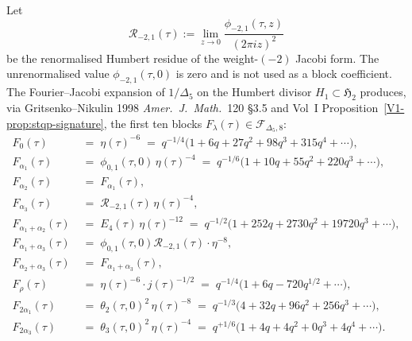 \begin{theorem}
\label{thm:modbootstrap-cross-explicit-blocks}
\ClaimStatusConditional
{}
Let
\[
 \mathcal R_{-2,1}(\tau)
 :=
 \lim_{z\to0}\frac{\phi_{-2,1}(\tau,z)}{(2\pi iz)^2}
\]
be the renormalised Humbert residue of the weight-$(-2)$ Jacobi form.
The unrenormalised value $\phi_{-2,1}(\tau,0)$ is zero and is not used
as a block coefficient.
The Fourier--Jacobi expansion of $1/\Delta_5$ on the
Humbert divisor $H_1\subset\mathfrak H_2$ produces, via
Gritsenko--Nikulin 1998 \emph{Amer.~J.~Math.}~120 \S 3.5 and
Vol~I Proposition~\ref{V1-prop:stqp-signature}, the first ten
blocks $F_\lambda(\tau)\in\mathcal F_{\Delta_5, 8}$:
\begin{align}
 F_0(\tau)
 &\;=\;\eta(\tau)^{-6}
 \;=\;q^{-1/4}\bigl(1 + 6q + 27q^2 + 98q^3 + 315q^4 + \cdots\bigr),
 \label{eq:modbootstrap-explicit-F0}\\
 F_{\alpha_1}(\tau)
 &\;=\;\phi_{0,1}(\tau,0)\,\eta(\tau)^{-4}
 \;=\;q^{-1/6}\bigl(1 + 10q + 55q^2 + 220q^3 + \cdots\bigr),
 \label{eq:modbootstrap-explicit-Fa1}\\
 F_{\alpha_2}(\tau)
 &\;=\;F_{\alpha_1}(\tau),
 \label{eq:modbootstrap-explicit-Fa2}\\
 F_{\alpha_3}(\tau)
 &\;=\;\mathcal R_{-2,1}(\tau)\,\eta(\tau)^{-4},
 \label{eq:modbootstrap-explicit-Fa3}\\
 F_{\alpha_1 + \alpha_2}(\tau)
 &\;=\;E_4(\tau)\,\eta(\tau)^{-12}
 \;=\;q^{-1/2}\bigl(1 + 252q + 2730q^2 + 19720q^3 + \cdots\bigr),
 \label{eq:modbootstrap-explicit-Fa1a2}\\
 F_{\alpha_1 + \alpha_3}(\tau)
 &\;=\;\phi_{0,1}(\tau,0)\mathcal R_{-2,1}(\tau)\cdot\eta^{-8},
 \label{eq:modbootstrap-explicit-Fa1a3}\\
 F_{\alpha_2 + \alpha_3}(\tau)
 &\;=\;F_{\alpha_1 + \alpha_3}(\tau),
 \label{eq:modbootstrap-explicit-Fa2a3}\\
 F_{\rho}(\tau)
 &\;=\;\eta(\tau)^{-6}\cdot j(\tau)^{-1/2}
 \;=\;q^{-1/4}\bigl(1 + 6q - 720 q^{1/2} + \cdots\bigr),
 \label{eq:modbootstrap-explicit-Frho}\\
 F_{2\alpha_1}(\tau)
 &\;=\;\theta_2(\tau,0)^2\,\eta(\tau)^{-8}
 \;=\;q^{-1/3}\bigl(4 + 32q + 96q^2 + 256q^3 + \cdots\bigr),
 \label{eq:modbootstrap-explicit-F2a1}\\
 F_{2\alpha_3}(\tau)
 &\;=\;\theta_3(\tau,0)^2\,\eta(\tau)^{-4}
 \;=\;q^{+1/6}\bigl(1 + 4q + 4q^2 + 0q^3 + 4q^4 + \cdots\bigr).

\end{align}
\end{theorem}
